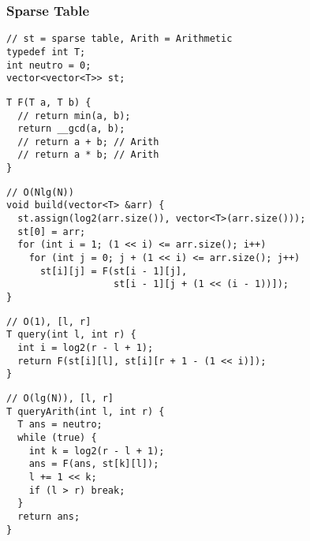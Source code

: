 \documentclass[twoside]{article}
\begin{document}
\begin{multicols*}{2}
\subsubsection*{Sparse Table}
\begin{verbatim}
// st = sparse table, Arith = Arithmetic
typedef int T;
int neutro = 0;
vector<vector<T>> st;
\end{verbatim}
\vspace{-12pt}
\begin{verbatim}
T F(T a, T b) {
  // return min(a, b);
  return __gcd(a, b);
  // return a + b; // Arith
  // return a * b; // Arith
}
\end{verbatim}
\vspace{-12pt}
\begin{verbatim}
// O(Nlg(N))
void build(vector<T> &arr) {
  st.assign(log2(arr.size()), vector<T>(arr.size()));
  st[0] = arr;
  for (int i = 1; (1 << i) <= arr.size(); i++)
    for (int j = 0; j + (1 << i) <= arr.size(); j++)
      st[i][j] = F(st[i - 1][j],
                   st[i - 1][j + (1 << (i - 1))]);
}
\end{verbatim}
\vspace{-12pt}
\begin{verbatim}
// O(1), [l, r]
T query(int l, int r) {
  int i = log2(r - l + 1);
  return F(st[i][l], st[i][r + 1 - (1 << i)]);
}
\end{verbatim}
\vspace{-12pt}
\begin{verbatim}
// O(lg(N)), [l, r]
T queryArith(int l, int r) {
  T ans = neutro;
  while (true) {
    int k = log2(r - l + 1);
    ans = F(ans, st[k][l]);
    l += 1 << k;
    if (l > r) break;
  }
  return ans;
}
\end{verbatim}

\subsubsectionfont{\large\bfseries\sffamily\underline}

\end{multicols*}
\end{document}
